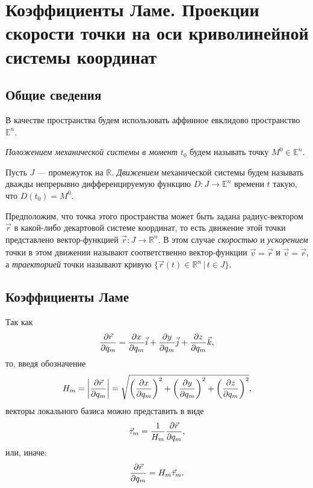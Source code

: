 \section{Коэффициенты Ламе. Проекции скорости точки на оси криволинейной
системы координат}

\subsection{Общие сведения}

В качестве пространства будем использовать аффинное евклидово пространство
$\mathbb{E}^n$.

\begin{definition}
  \textit{Положением механической системы в момент $t_0$} будем называть точку
  $M^0 \in \mathbb{E}^n$.
\end{definition}

\begin{definition}
  Пусть $J$ --- промежуток на $\mathbb{R}$. \textit{Движением} механической
  системы будем называть дважды непрерывно дифференцируемую функцию $D : J \to
  \mathbb{E}^n$ времени $t$ такую, что $D(t_0) = M^0$.
\end{definition}

\begin{definition}
  Предположим, что точка этого пространства может быть задана радиус-вектором
  $\vec{r}$ в какой-либо декартовой системе координат, то есть движение этой
  точки представлено вектор-функцией $\vec{r} : J \to \mathbb{R}^n$. В этом
  случае \textit{скоростью} и \textit{ускорением} точки в этом движении
  называют соответственно вектор-функции $\vec{v} = \dot{\vec{r}}$ и
  $\vec{v} = \ddot{\vec{r}}$, а \textit{траекторией} точки называют кривую
  $\{ \vec{r}(t) \in \mathbb{R}^n \, | \, t \in J \}$.
\end{definition}


\subsection{Коэффициенты Ламе}

Так как
\begin{equation}
  \parder[\vec{r}]{q_m} = \parder[x]{q_m} \vec{i} + \parder[y]{q_m} \vec{j} +
  \parder[z]{q_m} \vec{k},
\end{equation}
то, введя обозначение
\begin{equation}
  H_m = \abs{\parder[\vec{r}]{q_m}} = \sqrt{\paren{\parder[x]{q_m}}^2 +
  \paren{\parder[y]{q_m}}^2 + \paren{\parder[z]{q_m}}^2},
\end{equation}
векторы локального базиса можно представить в виде
\begin{equation}
  \label{eq:local_basis_vec}
  \vec{\tau}_m = \frac{1}{H_m} \parder[\vec{r}]{q_m},
\end{equation}
или, иначе:
\begin{equation}
  \label{eq:local_basis_vec_alt}
  \parder[\vec{r}]{q_m} = H_m \vec{\tau}_m.
\end{equation}

